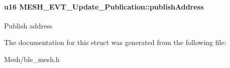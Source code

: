 \paragraph[{\texorpdfstring{publish\+Address}{publishAddress}}]{\setlength{\rightskip}{0pt plus 5cm}u16 M\+E\+S\+H\+\_\+\+E\+V\+T\+\_\+\+Update\+\_\+\+Publication\+::publish\+Address}\hypertarget{struct_m_e_s_h___e_v_t___update___publication_a338e8b4e91e4551b22bd8df5f57355bd}{}\label{struct_m_e_s_h___e_v_t___update___publication_a338e8b4e91e4551b22bd8df5f57355bd}
Publish address 

The documentation for this struct was generated from the following file\+:\begin{DoxyCompactItemize}
\item 
Mesh/ble\+\_\+mesh.\+h\end{DoxyCompactItemize}
